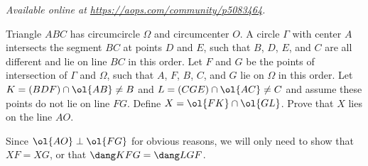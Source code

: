 \textsl{Available online at \url{https://aops.com/community/p5083464}.}
\begin{mdframed}[style=mdpurplebox,frametitle={Problem statement}]
Triangle $ABC$ has circumcircle $\Omega$ and circumcenter $O$.
A circle $\Gamma$ with center $A$
intersects the segment $BC$ at points $D$ and $E$,
such that $B$, $D$, $E$, and $C$ are all different
and lie on line $BC$ in this order.
Let $F$ and $G$ be the points of intersection of $\Gamma$ and $\Omega$,
such that $A$, $F$, $B$, $C$, and $G$ lie on $\Omega$ in this order.
Let $K = (BDF) \cap \ol{AB} \neq B$
and $L = (CGE) \cap \ol{AC} \neq C$
and assume these points do not lie on line $FG$.
Define $X = \ol{FK} \cap \ol{GL}$.
Prove that $X$ lies on the line $AO$.
\end{mdframed}
Since $\ol{AO} \perp \ol{FG}$ for obvious reasons,
we will only need to show that $XF = XG$,
or that $\dang KFG = \dang LGF$.


